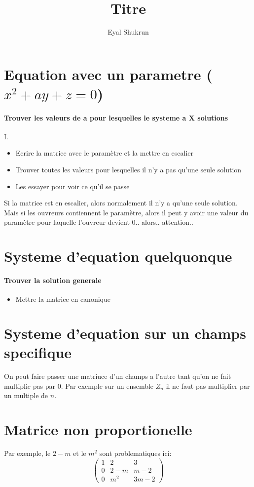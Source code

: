 \documentclass{article}
\title{Titre}
\author{Eyal Shukrun}
\begin{document}
\maketitle

\section{Equation avec un parametre ($x^{2} + ay + z = 0$)}
  
\paragraph{Trouver les valeurs de a pour lesquelles le systeme a X solutions}
I.
\begin{itemize}
  \item Ecrire la matrice avec le paramètre et la mettre en escalier
  \item Trouver toutes les valeurs pour lesquelles il n'y a pas qu'une seule solution
  \item Les essayer pour voir ce qu'il se passe
\end{itemize}

Si la matrice est en escalier, alors normalement il n'y a qu'une seule solution. Mais si les ouvreurs contiennent le paramètre, alors il peut y avoir une valeur du paramètre pour laquelle l'ouvreur devient 0.. alors.. attention..

\section{Systeme d'equation quelquonque}
\paragraph{Trouver la solution generale}
\begin{itemize}
  \item Mettre la matrice en canonique
\end{itemize}
 
\section{Systeme d'equation sur un champs specifique}
On peut faire passer une matriuce d'un champs a l'autre tant qu'on ne fait multiplie pas par 0. Par exemple sur un ensemble $Z_n$ il ne faut pas multiplier par un multiple de $n$. 
\section{Matrice non proportionelle}
Par exemple, le $2-m$ et le $m^{2}$ sont problematiques ici:
\begin{equation}
  \begin{pmatrix} 
    1 & 2 & 3 \\
    0 & 2-m & m-2 \\
    0 & m^2 & 3m-2 
  \end{pmatrix} 
\end{equation}
\end{document}

